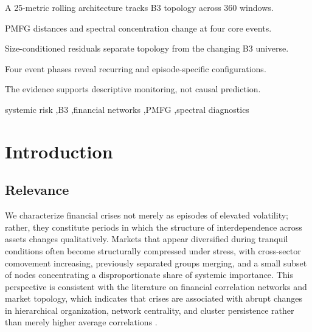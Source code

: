 \documentclass[a4paper,fleqn,review]{cas-sc}
\begin{document}
\raggedbottom
\begin{highlights}
\item A 25-metric rolling architecture tracks B3 topology across 360 windows.
\item PMFG distances and spectral concentration change at four core events.
\item Size-conditioned residuals separate topology from the changing B3 universe.
\item Four event phases reveal recurring and episode-specific configurations.
\item The evidence supports descriptive monitoring, not causal prediction.
\end{highlights}

\begin{keywords}
systemic risk \sep B3 \sep financial networks \sep PMFG \sep spectral diagnostics
\end{keywords}
\maketitle
\raggedbottom

\section{Introduction}
\label{sec:introduction}

\subsection{Relevance}

We characterize financial crises not merely as episodes of elevated volatility; rather, they constitute periods in which the structure of interdependence across assets changes qualitatively. Markets that appear diversified during tranquil conditions often become structurally compressed under stress, with cross-sector comovement increasing, previously separated groups merging, and a small subset of nodes concentrating a disproportionate share of systemic importance. This perspective is consistent with the literature on financial correlation networks and market topology, which indicates that crises are associated with abrupt changes in hierarchical organization, network centrality, and cluster persistence rather than merely higher average correlations \citep{mantegna1999hierarchical,tumminello2010correlation,musmeci2015risk}.
\end{document}
